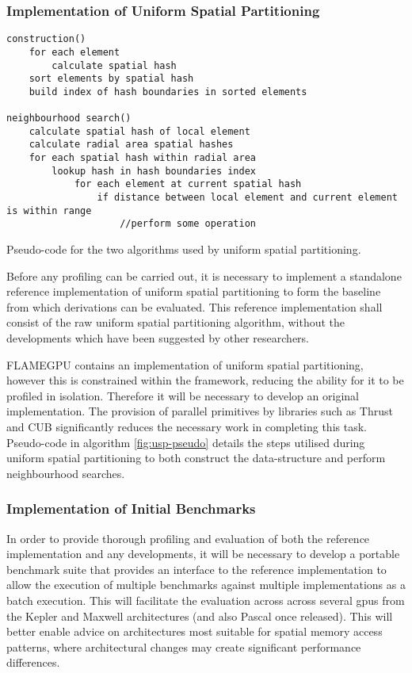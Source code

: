       \subsubsection*{Implementation of Uniform Spatial Partitioning}
\begin{algorithm}
\begin{lstlisting}
construction()
    for each element
        calculate spatial hash
    sort elements by spatial hash
    build index of hash boundaries in sorted elements

neighbourhood search()
    calculate spatial hash of local element
    calculate radial area spatial hashes
    for each spatial hash within radial area
        lookup hash in hash boundaries index
            for each element at current spatial hash
                if distance between local element and current element is within range
                    //perform some operation
\end{lstlisting}
\protect\caption{\label{fig:usp-pseudo}Pseudo-code for the two algorithms used by uniform spatial partitioning.}
\end{algorithm}
        Before any profiling can be carried out, it is necessary to implement a standalone reference implementation of uniform spatial partitioning to form the baseline from which derivations can be evaluated. This reference implementation shall consist of the raw uniform spatial partitioning algorithm, without the developments which have been suggested by other researchers\cite{GS*10,HY*15}.

        FLAMEGPU contains an implementation of uniform spatial partitioning, however this is constrained within the framework, reducing the ability for it to be profiled in isolation. Therefore it will be necessary to develop an original implementation. The provision of parallel primitives by libraries such as Thrust and CUB significantly reduces the necessary work in completing this task. Pseudo-code in algorithm \ref{fig:usp-pseudo} details the steps utilised during uniform spatial partitioning to both construct the data-structure and perform neighbourhood searches.
        
      \subsubsection*{Implementation of Initial Benchmarks}
        In order to provide thorough profiling and evaluation of both the reference implementation and any developments, it will be necessary to develop a portable benchmark suite that provides an interface to the reference implementation to allow the execution of multiple benchmarks against multiple implementations as a batch execution. This will facilitate the evaluation across across several \glspl{gpu} from the Kepler and Maxwell architectures (and also Pascal once released). This will better enable advice on architectures most suitable for spatial memory access patterns, where architectural changes may create significant performance differences.
        

